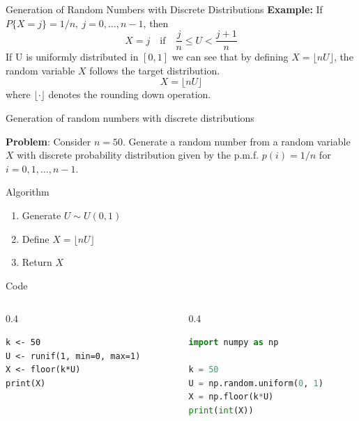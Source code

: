 \documentclass[8pt]{beamer}
\begin{document}
\begin{frame}[fragile]{Generation of Random Numbers with Discrete Distributions}
\textbf{Example:} If $P\{X = j\} = 1/n,\ j = 0,\dots,n-1$, then
\begin{equation*}
X = j \quad \text{if} \quad \frac{j}{n} \leq U < \frac{j+1}{n}
\end{equation*}
If U is uniformly distributed in $[0,1]$ we can see that by defining $X=\lfloor nU \rfloor$, the random variable $X$ follows the target distribution. 
$$
X = \lfloor nU \rfloor
$$
where $\lfloor \cdot \rfloor$ denotes the rounding down operation.
\vspace{2mm}
\end{frame}


\begin{frame}[fragile]{Generation of random numbers with discrete distributions}

\textbf{Problem}: Consider $n=50$. Generate a random number from a random variable $X$ with discrete probability distribution given by the p.m.f. 
$p(i)=1/n$ for $i=0,1,\ldots,n-1$.

\vspace{2mm}

\alert{Algorithm}
\begin{enumerate}
\item Generate $U\sim U(0,1)$
\item Define $X=\lfloor nU \rfloor$
\item Return $X$
\end{enumerate}

\vspace{2mm}

\alert{Code}

\begin{columns}[T]
\begin{column}{0.4\textwidth}
\begin{lstlisting}
k <- 50
U <- runif(1, min=0, max=1)
X <- floor(k*U)
print(X)
\end{lstlisting}
\end{column}

\begin{column}{0.4\textwidth}
\begin{lstlisting}[language=Python]
import numpy as np

k = 50
U = np.random.uniform(0, 1)
X = np.floor(k*U)
print(int(X))
\end{lstlisting}
\end{column}
\end{columns}
\end{frame}
\end{document}
